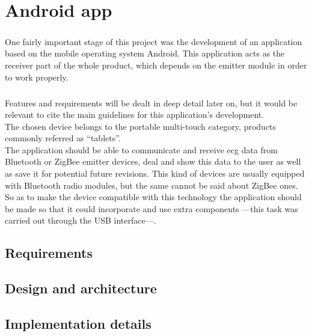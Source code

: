 \chapter{Android app} %

	
	\paragraph{}
	One fairly important stage of this project was the development of an application
	based on the mobile operating system Android. This application acts as the receiver
	part of the whole product, which depends on the emitter module in order to work
	properly.
	
	\paragraph{}
	Features and requirements will be dealt in deep detail later on, but it would be
	relevant to cite the main guidelines for this application's development.\\
	The chosen device belongs to the portable multi-touch category, products commonly referred as
	``tablets''.\\
	The application should be able to communicate and receive ecg data from Bluetooth
	or ZigBee emitter devices, deal and show this data to the user as well as
	save it for potential future revisions.
	This kind of devices are usually equipped with Bluetooth radio modules, but the same
	cannot be said about ZigBee ones. So as to make the device compatible with this
	technology the application should be made so that it could incorporate and use
	extra components ---this task was carried out through the USB interface---.

	\section{Requirements} %
	
	\section{Design and architecture}
	
	\section{Implementation details}
	
